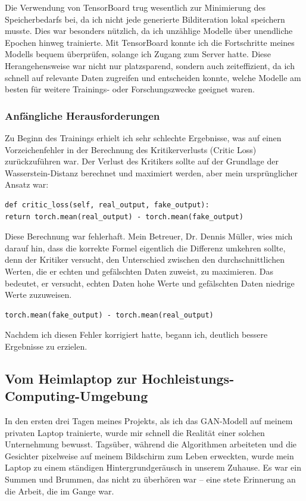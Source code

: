 \documentclass[a4paper, 12pt]{article}
\begin{document}
Die Verwendung von TensorBoard trug wesentlich zur Minimierung des Speicherbedarfs bei, da ich nicht jede generierte Bilditeration lokal speichern musste. Dies war besonders nützlich, da ich unzählige Modelle über unendliche Epochen hinweg trainierte. Mit TensorBoard konnte ich die Fortschritte meines Modells bequem überprüfen, solange ich Zugang zum Server hatte. Diese Herangehensweise war nicht nur platzsparend, sondern auch zeiteffizient, da ich schnell auf relevante Daten zugreifen und entscheiden konnte, welche Modelle am besten für weitere Trainings- oder Forschungszwecke geeignet waren.

\subsubsection{Anfängliche Herausforderungen}
Zu Beginn des Trainings erhielt ich sehr schlechte Ergebnisse, was auf einen Vorzeichenfehler in der Berechnung des Kritikerverlusts (Critic Loss) zurückzuführen war. Der Verlust des Kritikers sollte auf der Grundlage der Wasserstein-Distanz berechnet und maximiert werden, aber mein ursprünglicher Ansatz war:

\begin{verbatim}
def critic_loss(self, real_output, fake_output):
return torch.mean(real_output) - torch.mean(fake_output)
\end{verbatim}

Diese Berechnung war fehlerhaft. Mein Betreuer, Dr. Dennis Müller, wies mich darauf hin, dass die korrekte Formel eigentlich die Differenz umkehren sollte, denn der Kritiker versucht, den Unterschied zwischen den durchschnittlichen Werten, die er echten und gefälschten Daten zuweist, zu maximieren. Das bedeutet, er versucht, echten Daten hohe Werte und gefälschten Daten niedrige Werte zuzuweisen.

\begin{verbatim}
torch.mean(fake_output) - torch.mean(real_output)
\end{verbatim}

Nachdem ich diesen Fehler korrigiert hatte, begann ich, deutlich bessere Ergebnisse zu erzielen.

\subsection{Vom Heimlaptop zur Hochleistungs-Computing-Umgebung}
In den ersten drei Tagen meines Projekts, als ich das GAN-Modell auf meinem privaten Laptop trainierte, wurde mir schnell die Realität einer solchen Unternehmung bewusst. Tagsüber, während die Algorithmen arbeiteten und die Gesichter pixelweise auf meinem Bildschirm zum Leben erweckten, wurde mein Laptop zu einem ständigen Hintergrundgeräusch in unserem Zuhause. Es war ein Summen und Brummen, das nicht zu überhören war – eine stete Erinnerung an die Arbeit, die im Gange war.
\end{document}
